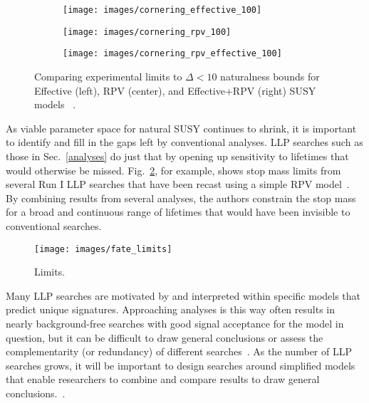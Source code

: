 \documentclass[12pt]{article}
\begin{document}
        \noindent \begin{figure}[htbp] \begin{center}
        \begin{subfigure}[htbp]{0.3\textwidth} \begin{center}
        \texttt{[image: images/cornering\_effective\_100]}
        \end{center} \end{subfigure}
        \begin{subfigure}[htbp]{0.3\textwidth} \begin{center}
        \texttt{[image: images/cornering\_rpv\_100]}
        \end{center} \end{subfigure}
        \begin{subfigure}[htbp]{0.3\textwidth} \begin{center}
        \texttt{[image: images/cornering\_rpv\_effective\_100]}
        \end{center} \end{subfigure}
            \caption{Comparing experimental limits to $\Delta < 10$ naturalness bounds for Effective (left), RPV (center), and Effective+RPV (right) SUSY models ~\cite{cornering}.}
        \label{cornering_limits}
        \end{center} \end{figure}

    As viable parameter space for natural SUSY continues to shrink, it is important to identify and fill in the gaps left by conventional analyses. LLP searches such as those in Sec.~\ref{analyses} do just that by opening up sensitivity to lifetimes that would otherwise be missed. Fig.~\ref{fate_limits}, for example, shows stop mass limits from several Run I LLP searches that have been recast using a simple RPV model~\cite{fate}. By combining results from several analyses, the authors constrain the stop mass for a broad and continuous range of lifetimes that would have been invisible to conventional searches. 

        \noindent \begin{figure}[htbp] \begin{center}
        \texttt{[image: images/fate\_limits]}
        \caption{Limits.~\cite{fate}}
        \label{fate_limits}
        \end{center} \end{figure}

    Many LLP searches are motivated by and interpreted within specific models that predict unique signatures. Approaching analyses is this way often results in nearly background-free searches with good signal acceptance for the model in question, but it can be difficult to draw general conclusions or assess the complementarity (or redundancy) of different searches~\cite{fate}. As the number of LLP searches grows, it will be important to design searches around simplified models that enable researchers to combine and compare results to draw general conclusions.~\cite{evans_talk}.
\end{document}
